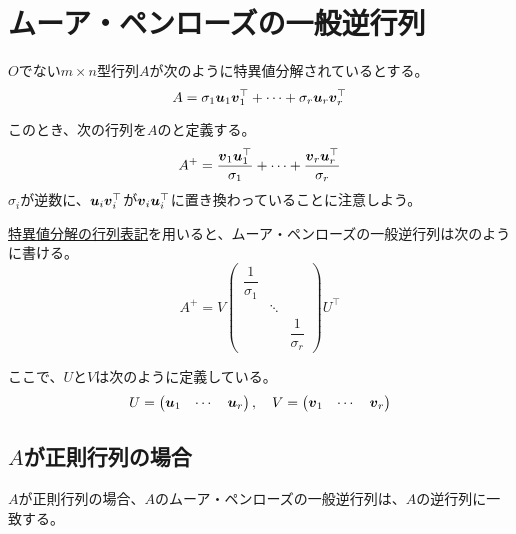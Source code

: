 \documentclass[../../../topic_linear-algebra]{subfiles}
\begin{document}
\sectionline
\section{ムーア・ペンローズの一般逆行列}

$O$でない$m \times n$型行列$A$が次のように特異値分解されているとする。
\begin{equation*}
  A = \sigma_1\vb*{u}_1\vb*{v}_1^\top + \cdots + \sigma_r \vb*{u}_r \vb*{v}_r^\top
\end{equation*}

このとき、次の行列を$A$のと定義する。
\begin{equation*}
  A^+ = \frac{\vb*{v}_1\vb*{u}_1^\top}{\sigma_1} + \cdots + \frac{\vb*{v}_r\vb*{u}_r^\top}{\sigma_r}
\end{equation*}
$\sigma_i$が逆数に、$\vb*{u}_i\vb*{v}_i^\top$が$\vb*{v}_i\vb*{u}_i^\top$に置き換わっていることに注意しよう。

\br

\hyperref[sec:matrix-form-svd]{特異値分解の行列表記}を用いると、ムーア・ペンローズの一般逆行列は次のように書ける。
\begin{equation*}
  A^+ = V \begin{pmatrix}
                        \dfrac{1}{\sigma_1} &        &           \\
                                  & \ddots &           \\
                                  &        & \dfrac{1}{\sigma_r}
                      \end{pmatrix} U^\top
\end{equation*}

ここで、$U$と$V$は次のように定義している。
\begin{equation*}
  U = \begin{pmatrix}
    \vb*{u}_1 & \cdots & \vb*{u}_r
  \end{pmatrix}, \quad
  V = \begin{pmatrix}
    \vb*{v}_1 & \cdots & \vb*{v}_r
  \end{pmatrix}
\end{equation*}

\subsection{$A$が正則行列の場合}

$A$が正則行列の場合、$A$のムーア・ペンローズの一般逆行列は、$A$の逆行列に一致する。
\end{document}
